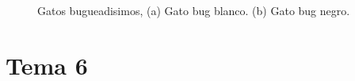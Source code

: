 \begin{figure}
\begin{subfigure}{.5\textwidth}
  \caption{}
  \label{fig:sfig2}
\end{subfigure}
\caption{Gatos bugueadisimos, (a) Gato bug blanco. (b) Gato bug negro.}
\label{fig:fig}
\end{figure}
\lipsum[29-31]

\section{Tema 6} %
\lipsum[32-35]
